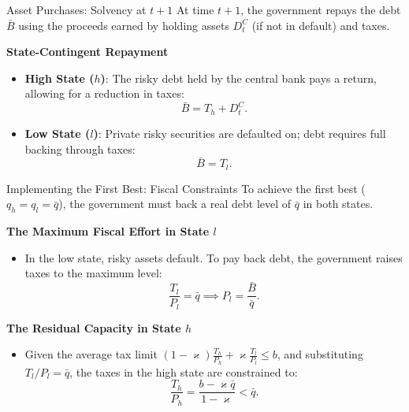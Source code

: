 \documentclass[11pt,aspectratio=169]{beamer}
\begin{document}
\begin{frame}{Asset Purchases: Solvency at $t+1$}
\small
At time $t+1$, the government repays the debt $\bar{B}$ using the proceeds earned by holding assets $D_{t}^{C}$ (if not in default) and taxes.

\vspace{0.3cm}
\textbf{State-Contingent Repayment}
\begin{itemize}
    \item \textbf{High State ($h$)}: The risky debt held by the central bank pays a return, allowing for a reduction in taxes:
    \begin{equation}
    \bar{B} = T_{h} + D_{t}^{C}. \label{eq: gvt bc h state, asset purchases}
    \end{equation}
    \item \textbf{Low State ($l$)}: Private risky securities are defaulted on; debt requires full backing through taxes:
    \begin{equation}
    \bar{B} = T_{l}. \label{eq: gvt bc l state, asset purchases}
    \end{equation}
\end{itemize}
\end{frame}
\begin{frame}{Implementing the First Best: Fiscal Constraints}
\small
To achieve the first best ($q_h = q_l = \bar{q}$), the government must back a real debt level of $\bar{q}$ in both states.

\vspace{0.3cm}
\textbf{The Maximum Fiscal Effort in State $l$}
\begin{itemize}
    \item In the low state, risky assets default. To pay back debt, the government raises taxes to the maximum level:
    \begin{equation}
    \frac{T_l}{P_l} = \bar{q} \implies P_l = \frac{\bar{B}}{\bar{q}}.
    \end{equation}
\end{itemize}

\vspace{0.3cm}
\textbf{The Residual Capacity in State $h$}
\begin{itemize}
    \item Given the average tax limit $(1-\varkappa)\frac{T_h}{P_h} + \varkappa\frac{T_l}{P_l} \leq b$, and substituting $T_l/P_l = \bar{q}$, the taxes in the high state are constrained to:
    \begin{equation}
    \frac{T_{h}}{P_{h}}=\frac{b-\varkappa \bar{q}}{1-\varkappa} < \bar{q}.
    \end{equation}
\end{itemize}
\end{frame}
\end{document}
